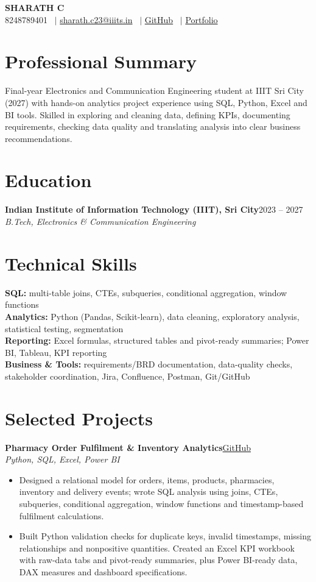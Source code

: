 \documentclass[10pt,a4paper]{article}
\newcommand{\role}[4]{\textbf{#1}\hfill #3\\[-1pt]\textit{#2}\hfill\textit{#4}\vspace{2pt}}
\newcommand{\project}[3]{\textbf{#1}\hfill\href{#3}{GitHub}\\[-1pt]\textit{#2}\vspace{1pt}}
\begin{document}
\begin{center}
{\LARGE\bfseries SHARATH C}\\[4pt]
8248789401 \ $|$ \href{mailto:sharath.c23@iiits.in}{sharath.c23@iiits.in} \ $|$ \href{https://github.com/06SharXD}{GitHub} \ $|$ \href{https://06sharxd.github.io/sharathc-portfolio/}{Portfolio}
\end{center}
\vspace{-4pt}

\section{Professional Summary}
Final-year Electronics and Communication Engineering student at IIIT Sri City (2027) with hands-on analytics project experience using SQL, Python, Excel and BI tools. Skilled in exploring and cleaning data, defining KPIs, documenting requirements, checking data quality and translating analysis into clear business recommendations.

\section{Education}
\role{Indian Institute of Information Technology (IIIT), Sri City}{B.Tech, Electronics \& Communication Engineering}{2023 -- 2027}{}

\section{Technical Skills}
\textbf{SQL:} multi-table joins, CTEs, subqueries, conditional aggregation, window functions\\
\textbf{Analytics:} Python (Pandas, Scikit-learn), data cleaning, exploratory analysis, statistical testing, segmentation\\
\textbf{Reporting:} Excel formulas, structured tables and pivot-ready summaries; Power BI, Tableau, KPI reporting\\
\textbf{Business \& Tools:} requirements/BRD documentation, data-quality checks, stakeholder coordination, Jira, Confluence, Postman, Git/GitHub

\section{Selected Projects}
\project{Pharmacy Order Fulfilment \& Inventory Analytics}{Python, SQL, Excel, Power BI}{https://github.com/06SharXD/pharmacy-order-analytics}
\begin{itemize}
\item Designed a relational model for orders, items, products, pharmacies, inventory and delivery events; wrote SQL analysis using joins, CTEs, subqueries, conditional aggregation, window functions and timestamp-based fulfilment calculations.
\item Built Python validation checks for duplicate keys, invalid timestamps, missing relationships and nonpositive quantities. Created an Excel KPI workbook with raw-data tabs and pivot-ready summaries, plus Power BI-ready data, DAX measures and dashboard specifications.
\end{itemize}
\end{document}
